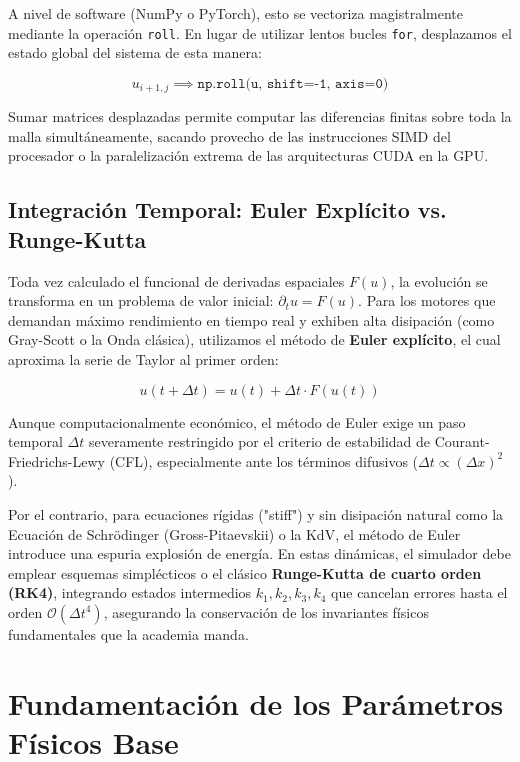\documentclass[12pt, openany]{book}
\begin{document}
A nivel de software (NumPy o PyTorch), esto se vectoriza magistralmente mediante la operación \texttt{roll}. En lugar de utilizar lentos bucles \texttt{for}, desplazamos el estado global del sistema de esta manera:

\begin{equation}
u_{i+1,j} \implies \texttt{np.roll(u, shift=-1, axis=0)}
\end{equation}

Sumar matrices desplazadas permite computar las diferencias finitas sobre toda la malla simultáneamente, sacando provecho de las instrucciones SIMD del procesador o la paralelización extrema de las arquitecturas CUDA en la GPU.

\subsection{Integración Temporal: Euler Explícito vs. Runge-Kutta}
Toda vez calculado el funcional de derivadas espaciales $F(u)$, la evolución se transforma en un problema de valor inicial: $\partial_t u = F(u)$. Para los motores que demandan máximo rendimiento en tiempo real y exhiben alta disipación (como Gray-Scott o la Onda clásica), utilizamos el método de \textbf{Euler explícito}, el cual aproxima la serie de Taylor al primer orden:

\begin{equation}
u(t + \Delta t) = u(t) + \Delta t \cdot F(u(t))
\end{equation}

Aunque computacionalmente económico, el método de Euler exige un paso temporal $\Delta t$ severamente restringido por el criterio de estabilidad de Courant-Friedrichs-Lewy (CFL), especialmente ante los términos difusivos ($\Delta t \propto (\Delta x)^2$). 

Por el contrario, para ecuaciones rígidas ("stiff") y sin disipación natural como la Ecuación de Schrödinger (Gross-Pitaevskii) o la KdV, el método de Euler introduce una espuria explosión de energía. En estas dinámicas, el simulador debe emplear esquemas simplécticos o el clásico \textbf{Runge-Kutta de cuarto orden (RK4)}, integrando estados intermedios $k_1, k_2, k_3, k_4$ que cancelan errores hasta el orden $\mathcal{O}(\Delta t^4)$, asegurando la conservación de los invariantes físicos fundamentales que la academia manda.

\section{Fundamentación de los Parámetros Físicos Base}
\end{document}

